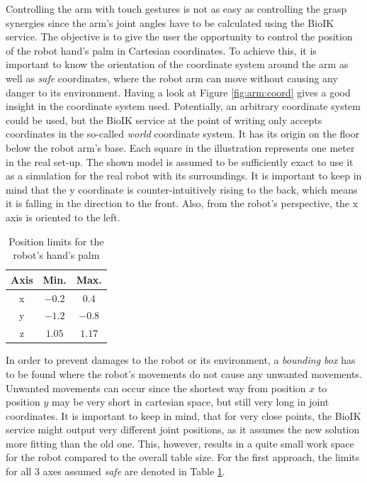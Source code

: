 Controlling the arm with touch gestures is not as easy as controlling the grasp synergies since the arm's joint angles have to be calculated using the BioIK service. The objective is to give the user the opportunity to control the position of the robot hand's palm in Cartesian coordinates. To achieve this, it is important to know the orientation of the coordinate system around the arm as well as \textit{safe} coordinates, where the robot arm can move without causing any danger to its environment. Having a look at Figure \ref{fig:arm:coord} gives a good insight in the coordinate system used. Potentially, an arbitrary coordinate system could be used, but the BioIK service at the point of writing only accepts coordinates in the so-called \textit{world} coordinate system. It has its origin on the floor below the robot arm's base. Each square in the illustration represents one meter in the real set-up. The shown model is assumed to be sufficiently exact to use it as a simulation for the real robot with its surroundings. It is important to keep in mind that the y coordinate is counter-intuitively rising to the back, which means it is falling in the direction to the front. Also, from the robot's perspective, the x axis is oriented to the left.

\begin{table}
	\caption{\label{tab:safeaxes}Position limits for the robot's hand's palm}
	\begin{tabular}{|c|c|c|}
		\hline
		\textbf{Axis} & \textbf{Min.} & \textbf{Max.} \\
		\hline
		x & $-0.2$ & $0.4$ \\
		\hline
		y & $-1.2$ & $-0.8$ \\
		\hline
		z & $1.05$ & $1.17$ \\
		\hline
	\end{tabular}
\end{table}

In order to prevent damages to the robot or its environment, a \textit{bounding box} has to be found where the robot's movements do not cause any unwanted movements. Unwanted movements can occur since the shortest way from position $x$ to position $y$ may be very short in cartesian space, but still very long in joint coordinates. It is important to keep in mind, that for very close points, the BioIK service might output very different joint positions, as it assumes the new solution more fitting than the old one. This, however, results in a quite small work space for the robot compared to the overall table size. For the first approach, the limits for all 3 axes assumed \textit{safe} are denoted in Table \ref{tab:safeaxes}.


